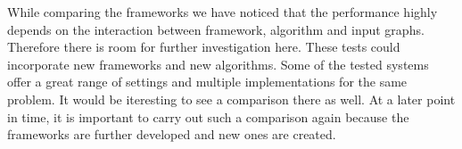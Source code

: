 While comparing the frameworks we have noticed that the performance highly depends on the interaction between framework, algorithm and input graphs.
Therefore there is room for further investigation here. These tests could incorporate new frameworks and new algorithms.
Some of the tested systems offer a great range of settings and multiple implementations for the same problem. It would be iteresting to see a comparison there as well.
At a later point in time, it is important to carry out such a comparison again because the frameworks are further developed and new ones are created.
